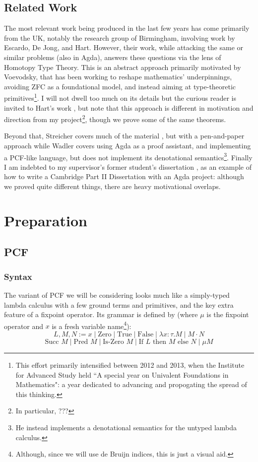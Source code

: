 \documentclass[12pt,a4paper,twoside,openright]{report}
\begin{document}
\section{Related Work}
The most relevant work being produced in the last few years has come primarily from the UK, notably the research group of Birmingham, involving work by Escardo, De Jong, and Hart. However, their work, while attacking the same or similar problems (also in Agda), answers these questions via the lens of Homotopy Type Theory. This is an abstract approach primarily motivated by Voevodsky, that has been working to reshape mathematics' underpinnings, avoiding ZFC as a foundational model, and instead aiming at type-theoretic primitives\footnote{This effort primarily intensified between 2012 and 2013, when the Institute for Advanced Study held ``A special year on Univalent Foundations in Mathematics": a year dedicated to advancing and propogating the spread of this thinking.}. I will not dwell too much on its details but the curious reader is invited to Hart's work \cite{Hart}, but note that this approach is different in motivation and direction from my project\footnote{In particular, ???}, though we prove some of the same theorems.

Beyond that, Streicher \cite{Streicher} covers much of the material , but with a pen-and-paper approach while Wadler \cite{PLFA} covers using Agda as a proof assistant, and implementing a PCF-like language, but does not implement its denotational semantics\footnote{He instead implements a denotational semantics for the untyped lambda calculus.}. Finally I am indebted to my supervisor's former student's dissertation \cite{Ted}, as an example of how to write a Cambridge Part II Dissertation with an Agda project: although we proved quite different things, there are heavy motivational overlaps. 
\chapter{Preparation}
\section{PCF}
\subsection{Syntax}
The variant of PCF we will be considering looks much like a simply-typed lambda calculus with a few ground terms and primitives, and the key extra feature of a fixpoint operator. Its grammar is defined by (where $\mu$ is the fixpoint operator and $x$ is a fresh variable name\footnote{Although, since we will use de Bruijn indices, this is just a visual aid.}):
\[
L, M, N := x \mid \text{Zero} \mid \text{True} \mid \text{False} \mid \lambda x: \tau . M \mid M \cdot N 
\]
\[
\text{Succ }M \mid \text{Pred }M \mid \text{Is-Zero }M \mid \text{If }L \text{ then }M \text{ else }N \mid \mu M
\]
\end{document}
